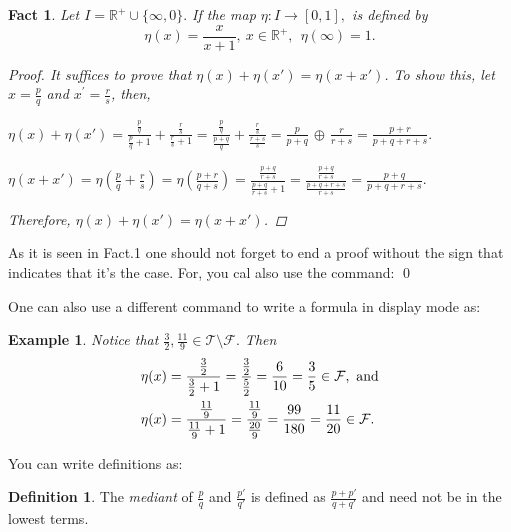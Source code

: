 \documentclass[11pt]{amsart}
\theoremstyle{plain}
\newtheorem{fact}{Fact}
\newtheorem{exa}{Example}
\theoremstyle{definition}
\newtheorem*{defi}{Definition}
\begin{document}
\begin{fact}
Let $I=\mathbb{R^+}\cup \{\infty, 0 \}. $  If the map $\eta: I \rightarrow [0,1], $ is defined by
$$ \eta (x) = \frac{x}{x+1}, \ x \in \mathbb{R}^+ , \ \ 
\eta(\infty) = 1 . $$

\begin{proof}  It suffices to prove that $\eta(x) + \eta (x')=\eta (x + x')$. To show this, let $x = \frac{p}{q}$ and $x^\prime = \frac{r}{s}$, then, 

\begin{center}
$\eta(x) + \eta (x') = \frac{\frac{p}{q}}{\frac{p}{q}+1} + \frac{\frac{r}{s}}{\frac{r}{s}+1} = \frac{\frac{p}{q}}{\frac{p+q}{q}} + \frac{\frac{r}{s}}{\frac{r+s}{s}} = \frac{p}{p+q}$ $\oplus$ $\frac{r}{r+s} = \frac{p+r}{p+q+r+s} . $
\end{center}

\begin{center}
$\eta (x + x') = \eta (\frac{p}{q} + \frac{r}{s})= \eta (\frac{p+r}{q+s}) = \frac{\frac{p+q}{r+s}}{\frac{p+q}{r+s}+1} = \frac{\frac{p+q}{r+s}}{\frac{p+q+r+s}{r+s}} = \frac{p+q}{p+q+r+s}.$
\end{center}
Therefore, $\eta (x) + \eta (x')=\eta (x + x')$.
\end{proof}
\end{fact}
\medskip

  As it is seen in Fact.1 one should not forget to end a proof without the sign that indicates that it's the case.  For, you cal also use the command: \qed 
\medskip

One can also use a different command to write a formula in display mode as:

\begin{exa}  Notice that $\frac{3}{2}, \frac{11}{9}
\in \mathcal{T} \setminus \mathcal{F}.  $  Then
$$\aligned & \eta(x)= \frac{\frac{3}{2}}{\frac{3}{2}+1} = \frac{\frac{3}{2}}{\frac{5}{2}} = \frac{6}{10} = \frac{3}{5} \in \mathcal{F}, \ \text{and} \\
& \eta(x)= \frac{\frac{11}{9}}{\frac{11}{9}+1} = \frac{\frac{11}{9}}{\frac{20}{9}} = \frac{99}{180} = \frac{11}{20} \in \mathcal{F}.
\endaligned $$
\end{exa}
\medskip

You can write definitions as:

\begin{defi} The {\it mediant} of $\frac{p}{q}$ and $\frac{p'}{q'}$ is defined as $\frac{p+{p}'}{q+{q}'} $ and need not be in the lowest terms.
\end{defi}
\medskip
\end{document}
